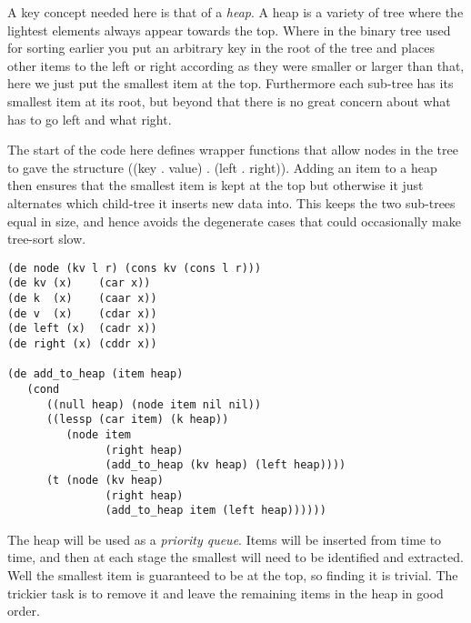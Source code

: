 A key concept needed here is that of a {\em heap}. A heap is a variety
of tree where the lightest elements always appear towards the top. Where in
the binary tree used for sorting earlier you put an arbitrary key in the
root of the tree and places other items to the left or right according as they
were smaller or larger than that, here we just put the smallest item
at the top. Furthermore each sub-tree has its smallest item at its root, but
beyond that there is no great concern about what has to go left and what
right.

The start of the code here defines wrapper functions that allow nodes
in the tree to gave the structure {\tx ((key . value) . (left . right))}.
Adding an item to a heap then ensures that the smallest item is kept at the
top but otherwise it just alternates which child-tree it inserts new
data into. This keeps the two sub-trees equal in size, and hence avoids the
degenerate cases that could occasionally make tree-sort slow.
{\small\begin{verbatim}
(de node (kv l r) (cons kv (cons l r)))
(de kv (x)    (car x))
(de k  (x)    (caar x))
(de v  (x)    (cdar x))
(de left (x)  (cadr x))
(de right (x) (cddr x))

(de add_to_heap (item heap)
   (cond
      ((null heap) (node item nil nil))
      ((lessp (car item) (k heap))
         (node item
               (right heap)
               (add_to_heap (kv heap) (left heap))))
      (t (node (kv heap)
               (right heap)
               (add_to_heap item (left heap))))))
\end{verbatim}}

The heap will be used as a {\em priority queue}. Items will be inserted
from time to time, and then at each stage the smallest will need to be
identified and extracted. Well the smallest item is guaranteed to be at the
top, so finding it is trivial. The trickier task is to remove it and leave
the remaining items in the heap in good order.

